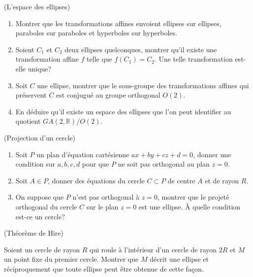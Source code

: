 \documentclass[a4paper,12pt,reqno]{amsart}
\begin{document}
\begin{exo} (L'espace des ellipses)

  \begin{enumerate}
    \item Montrer que les transformations affines envoient ellipses sur ellipses, paraboles sur paraboles et hyperboles sur hyperboles.
    \item Soient $C_1$ et $C_2$ deux ellipses quelconques, montrer qu'il existe une transformation affine $f$ telle que $f(C_1)=C_2$. Une telle transformation est-elle unique?
    \item Soit $C$ une ellipse, montrer que le sous-groupe des transformations affines qui préservent $C$ est conjugué au groupe orthogonal $O(2)$.
    \item\hard En déduire qu'il existe un espace des ellipses que l'on peut identifier au quotient $GA(2, \mathbb{R})/O(2)$.
  \end{enumerate}

\end{exo}


\begin{exo} (Projection d'un cercle)

  \begin{enumerate}
    \item  Soit $P$ un plan d'équation cartésienne $ax+by+cz+d=0$, donner une condition sur $a,b,c,d$ pour que $P$ ne soit pas orthogonal au plan $z=0$.
    \item Soit $A\in P$, donner des équations du cercle $C\subset P$ de centre $A$ et de rayon $R$.
    \item On suppose que $P$ n'est pas orthogonal à $z=0$, montrer que le projeté orthogonal du cercle $C$ sur le plan $z=0$ est une ellipse.  À quelle condition est-ce un cercle?
  \end{enumerate}

\end{exo}


\begin{exo} (Théorème de Hire)


  Soient un cercle de rayon $R$ qui roule à l'intérieur d'un cercle de rayon $2R$ et $M$ un point fixe du premier cercle. Montrer que $M$ décrit une ellipse et réciproquement que toute ellipse peut être obtenue de cette façon.

\end{exo}
\end{document}
